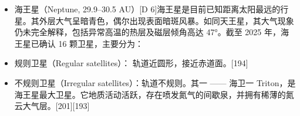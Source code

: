 \begin{itemize}
\item 海王星（Neptune, 29.9–30.5 AU）[D 6]海王星是目前已知距离太阳最远的行星。其外层大气呈暗青色，偶尔出现表面暗斑风暴。如同天王星，其大气现象仍未完全解释，包括异常高温的热层及磁层倾角高达 47°。截至 2025 年，海王星已确认 16 颗卫星，主要分为：  
\item 规则卫星（Regular satellites）： 轨道近圆形，接近赤道面。[194]  
\item 不规则卫星（Irregular satellites）：轨道不规则。其一 —— 海卫一 Triton，是海王星最大卫星。它地质活动活跃，存在喷发氮气的间歇泉，并拥有稀薄的氮云大气层。[201][193]
\end{itemize}




